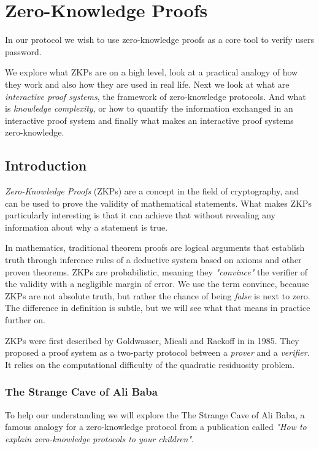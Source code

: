 \section{Zero-Knowledge Proofs}
In our protocol we wish to use zero-knowledge proofs as a core tool to verify users password.

We explore what ZKPs are on a high level, look at a practical analogy of how they work and also how they are used in real life.
Next we look at what are \textit{interactive proof systems}, the framework of zero-knowledge protocols.
And what is \textit{knowledge complexity}, or how to quantify the information exchanged in an interactive proof system and finally what makes an interactive proof systems zero-knowledge.

\subsection{Introduction}
\textit{Zero-Knowledge Proofs} (ZKPs) are a concept in the field of cryptography, and can be used to prove the validity of mathematical statements. What makes ZKPs particularly interesting is that it can achieve that without revealing any information about why a statement is true.

In mathematics, traditional theorem proofs are logical arguments that establish truth through inference rules of a deductive system based on axioms and other proven theorems.
ZKPs are probabilistic, meaning they \textit{"convince"} the verifier of the validity with a negligible margin of error.
We use the term convince, because ZKPs are not absolute truth, but rather the chance of being \textit{false} is next to zero. The difference in definition is subtle, but we will see what that means in practice further on.

ZKPs were first described by Goldwasser, Micali and Rackoff in \cite{GMR} in 1985. 
They proposed a proof system as a two-party protocol between a \textit{prover} and a \textit{verifier}. It relies on the computational difficulty of the quadratic residuosity problem.
\newpage
\subsubsection{The Strange Cave of Ali Baba}
To help our understanding we will explore the \cite{QJM} The Strange Cave of Ali Baba, a famous analogy for a zero-knowledge protocol from a publication called \textit{"How to explain zero-knowledge protocols to your children"}.

